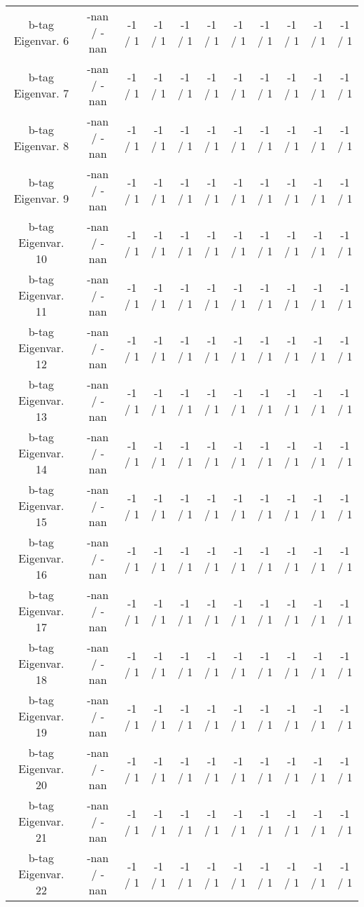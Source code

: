 \begin{table}[htbp]
\begin{center}
\begin{tabular}{|c|c|c|c|c|c|c|c|c|c|c|}
  b-tag Eigenvar. 6 & -nan / -nan & -1 / 1 & -1 / 1 & -1 / 1 & -1 / 1 & -1 / 1 & -1 / 1 & -1 / 1 & -1 / 1 & -1 / 1 \\ 
  b-tag Eigenvar. 7 & -nan / -nan & -1 / 1 & -1 / 1 & -1 / 1 & -1 / 1 & -1 / 1 & -1 / 1 & -1 / 1 & -1 / 1 & -1 / 1 \\ 
  b-tag Eigenvar. 8 & -nan / -nan & -1 / 1 & -1 / 1 & -1 / 1 & -1 / 1 & -1 / 1 & -1 / 1 & -1 / 1 & -1 / 1 & -1 / 1 \\ 
  b-tag Eigenvar. 9 & -nan / -nan & -1 / 1 & -1 / 1 & -1 / 1 & -1 / 1 & -1 / 1 & -1 / 1 & -1 / 1 & -1 / 1 & -1 / 1 \\ 
  b-tag Eigenvar. 10 & -nan / -nan & -1 / 1 & -1 / 1 & -1 / 1 & -1 / 1 & -1 / 1 & -1 / 1 & -1 / 1 & -1 / 1 & -1 / 1 \\ 
  b-tag Eigenvar. 11 & -nan / -nan & -1 / 1 & -1 / 1 & -1 / 1 & -1 / 1 & -1 / 1 & -1 / 1 & -1 / 1 & -1 / 1 & -1 / 1 \\ 
  b-tag Eigenvar. 12 & -nan / -nan & -1 / 1 & -1 / 1 & -1 / 1 & -1 / 1 & -1 / 1 & -1 / 1 & -1 / 1 & -1 / 1 & -1 / 1 \\ 
  b-tag Eigenvar. 13 & -nan / -nan & -1 / 1 & -1 / 1 & -1 / 1 & -1 / 1 & -1 / 1 & -1 / 1 & -1 / 1 & -1 / 1 & -1 / 1 \\ 
  b-tag Eigenvar. 14 & -nan / -nan & -1 / 1 & -1 / 1 & -1 / 1 & -1 / 1 & -1 / 1 & -1 / 1 & -1 / 1 & -1 / 1 & -1 / 1 \\ 
  b-tag Eigenvar. 15 & -nan / -nan & -1 / 1 & -1 / 1 & -1 / 1 & -1 / 1 & -1 / 1 & -1 / 1 & -1 / 1 & -1 / 1 & -1 / 1 \\ 
  b-tag Eigenvar. 16 & -nan / -nan & -1 / 1 & -1 / 1 & -1 / 1 & -1 / 1 & -1 / 1 & -1 / 1 & -1 / 1 & -1 / 1 & -1 / 1 \\ 
  b-tag Eigenvar. 17 & -nan / -nan & -1 / 1 & -1 / 1 & -1 / 1 & -1 / 1 & -1 / 1 & -1 / 1 & -1 / 1 & -1 / 1 & -1 / 1 \\ 
  b-tag Eigenvar. 18 & -nan / -nan & -1 / 1 & -1 / 1 & -1 / 1 & -1 / 1 & -1 / 1 & -1 / 1 & -1 / 1 & -1 / 1 & -1 / 1 \\ 
  b-tag Eigenvar. 19 & -nan / -nan & -1 / 1 & -1 / 1 & -1 / 1 & -1 / 1 & -1 / 1 & -1 / 1 & -1 / 1 & -1 / 1 & -1 / 1 \\ 
  b-tag Eigenvar. 20 & -nan / -nan & -1 / 1 & -1 / 1 & -1 / 1 & -1 / 1 & -1 / 1 & -1 / 1 & -1 / 1 & -1 / 1 & -1 / 1 \\ 
  b-tag Eigenvar. 21 & -nan / -nan & -1 / 1 & -1 / 1 & -1 / 1 & -1 / 1 & -1 / 1 & -1 / 1 & -1 / 1 & -1 / 1 & -1 / 1 \\ 
  b-tag Eigenvar. 22 & -nan / -nan & -1 / 1 & -1 / 1 & -1 / 1 & -1 / 1 & -1 / 1 & -1 / 1 & -1 / 1 & -1 / 1 & -1 / 1 \\ 

\end{tabular}
\end{center}
\end{table}
